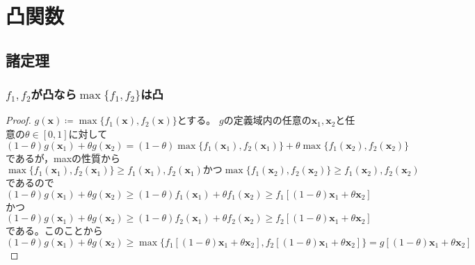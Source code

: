 \chapter{凸関数}
    \section{諸定理}
        \subsection{\texorpdfstring{$f_1,f_2$}{f\_1,f\_2}が凸なら\texorpdfstring{$\max\{f_1,f_2\}$}{max(f\_1,f\_2)}は凸}
        \begin{proof}
            \quad\par
            $g(\bm{x}) \coloneq \max\{f_1(\bm{x}), f_2(\bm{x})\}$とする。
            $g$の定義域内の任意の$\bm{x}_1,\bm{x}_2$と任意の$\theta\in[0,1]$に対して
            \[ (1-\theta)g(\bm{x}_1) + \theta g(\bm{x}_2) = (1-\theta)\max\{f_1(\bm{x}_1), f_2(\bm{x}_1)\} + \theta\max\{f_1(\bm{x}_2), f_2(\bm{x}_2)\} \]
            であるが，maxの性質から
            \[ \max\{f_1(\bm{x}_1), f_2(\bm{x}_1)\} \geq f_1(\bm{x}_1), f_2(\bm{x}_1) \text{かつ} \max\{f_1(\bm{x}_2), f_2(\bm{x}_2)\} \geq f_1(\bm{x}_2), f_2(\bm{x}_2) \]
            であるので
            \[(1-\theta)g(\bm{x}_1) + \theta g(\bm{x}_2) \geq (1-\theta)f_1(\bm{x}_1) + \theta f_1(\bm{x}_2) \geq f_1[(1-\theta)\bm{x}_1 + \theta\bm{x}_2]\]
            かつ
            \[(1-\theta)g(\bm{x}_1) + \theta g(\bm{x}_2) \geq (1-\theta)f_2(\bm{x}_1) + \theta f_2(\bm{x}_2) \geq f_2[(1-\theta)\bm{x}_1 + \theta\bm{x}_2]\]
            である。このことから
            \[(1-\theta)g(\bm{x}_1) + \theta g(\bm{x}_2) \geq \max\{f_1[(1-\theta)\bm{x}_1 + \theta\bm{x}_2], f_2[(1-\theta)\bm{x}_1 + \theta\bm{x}_2]\} = g[(1-\theta)\bm{x}_1 + \theta\bm{x}_2]\]
        \end{proof}
